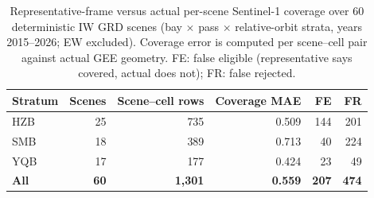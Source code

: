 \begin{table}[t]
\centering
\small
\caption{Representative-frame versus actual per-scene Sentinel-1
coverage over 60 deterministic IW GRD scenes (bay $\times$ pass
$\times$ relative-orbit strata, years 2015--2026; EW excluded).
Coverage error is computed per scene--cell pair against actual GEE
geometry. FE: false eligible (representative says covered, actual does
not); FR: false rejected.}
\label{tab:s1footprint}
\begin{tabular}{lrrrrr}
\toprule
Stratum & Scenes & Scene--cell rows & Coverage MAE & FE & FR \\
\midrule
HZB & 25 & 735 & 0.509 & 144 & 201 \\
SMB & 18 & 389 & 0.713 & 40 & 224 \\
YQB & 17 & 177 & 0.424 & 23 & 49 \\
\midrule
\textbf{All} & \textbf{60} & \textbf{1{,}301} & \textbf{0.559} &
\textbf{207} & \textbf{474} \\
\bottomrule
\end{tabular}
\end{table}
